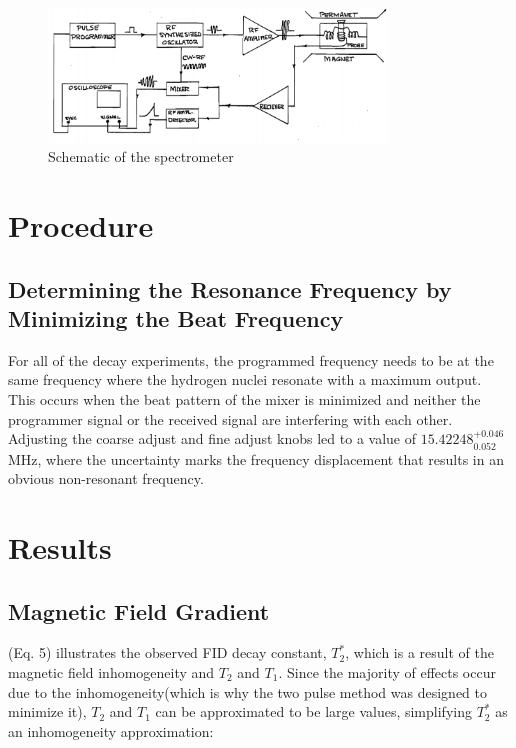 \documentclass[]{report}
\begin{document}
\begin{figure}[h]

\centering
\includegraphics[width=9cm]{schematic} 

\caption{Schematic of the spectrometer}

\end{figure}


\section{Procedure}

\subsection{Determining the Resonance Frequency by Minimizing the Beat Frequency}

For all of the decay experiments, the programmed frequency needs to be at the same frequency where the hydrogen nuclei resonate with a maximum output. This occurs when the beat pattern of the mixer is minimized and neither the programmer signal or the received signal are interfering with each other. 
Adjusting the coarse adjust and fine adjust knobs led to a value of $15.42248^{+0.046}_{0.052} $ MHz, where the uncertainty marks the frequency displacement that results in an obvious non-resonant frequency.

\section{Results}

\subsection{Magnetic Field Gradient}

(Eq. 5) illustrates the observed FID decay constant, $T_{2}^*$, which is a result of the magnetic field inhomogeneity and $T_{2}$ and $T_{1}$. Since the majority of effects occur due to the inhomogeneity(which is why the two pulse method was designed to minimize it), $T_{2}$ and $T_{1}$ can be approximated to be large values, simplifying $T_{2}^*$ as an inhomogeneity approximation: 
\end{document}
